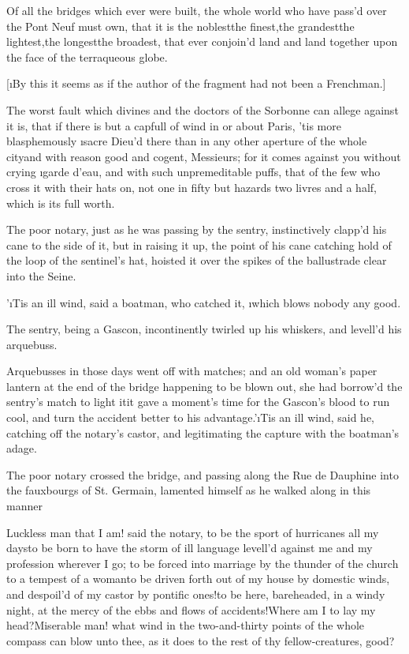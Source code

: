 \documentclass[twoside]{article}
\begin{document}
Of all the bridges which ever were built,
the whole world who have pass’d over the
Pont Neuf must own, that it is the
noblest\tskk the finest,\tskk the
grandest\tskk the lightest,\tskk the
longest\tskk the broadest, that ever
conjoin’d land and land together upon the
face of the terraqueous globe.

[\i{By this it seems as if the author of
the fragment had not been a Frenchman}.]

The worst fault which divines and the
doctors of the Sorbonne can allege against
it is, that if there is but a capfull of
wind in or about Paris, ’tis more
blasphemously \i{sacre Dieu’d} there than
in any other aperture of the whole
city\tskk and with reason good and
cogent, Messieurs; for it comes against
you without crying \i{garde d’eau}, and
with such unpremeditable puffs, that of
the few who cross it with their hats on,
not one in fifty but hazards two livres
and a half, which is its full worth.

The poor notary, just as he was passing by
the sentry, instinctively clapp’d his cane
to the side of it, but in raising it up,
the point of his cane catching hold of the
loop of the sentinel’s hat, hoisted it
over the spikes of the ballustrade clear
into the Seine.\tskk 

\tskk ’\i{Tis an ill wind}, said a
boatman, who catched it, \i{which blows
nobody any good}.

The sentry, being a Gascon, incontinently
twirled up his whiskers, and levell’d his
arquebuss.

Arquebusses in those days went off with
matches; and an old woman’s paper lantern
at the end of the bridge happening to be
blown out, she had borrow’d the sentry’s
match to light it\tskk it gave a moment’s
time for the Gascon’s blood to run cool,
and turn the accident better to his
advantage.\tskk ’\i{Tis an ill wind}, said
he, catching off the notary’s castor, and
legitimating the capture with the
boatman’s adage.

The poor notary crossed the bridge, and
passing along the Rue de Dauphine into the
fauxbourgs of St. Germain, lamented
himself as he walked along in this
manner\tskk 

Luckless man that I am! said the notary,
to be the sport of hurricanes all my
days\tskk to be born to have the storm of
ill language levell’d against me and my
profession wherever I go; to be forced
into marriage by the thunder of the church
to a tempest of a woman\tskk to be driven
forth out of my house by domestic winds,
and despoil’d of my castor by pontific
ones!\tskk to be here, bareheaded, in a
windy night, at the mercy of the ebbs and
flows of accidents!\tskk Where am I to lay
my head?\tskk Miserable man! what wind in
the two-and-thirty points of the whole
compass can blow unto thee, as it does to
the rest of thy fellow-creatures, good?
\end{document}
